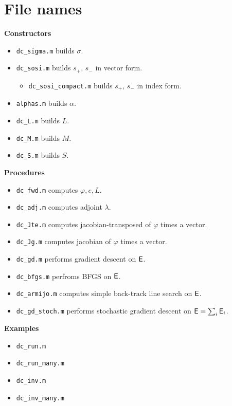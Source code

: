 \documentclass[a4paper,12pt]{article}
\begin{document}
\section{File names}
{\bf Constructors}
\begin{itemize}
\item \texttt{dc\_sigma.m} builds $\sigma$.
\item \texttt{dc\_sosi.m} builds $s_+,\, s_-$ in vector form.
\begin{itemize}
 \item \texttt{dc\_sosi\_compact.m} builds $s_+,\, s_-$ in index form.
\end{itemize}
\item \texttt{alphas.m} builds $\alpha$.
\item \texttt{dc\_L.m} builds $L$.
\item \texttt{dc\_M.m} builds $M$.
\item \texttt{dc\_S.m} builds $S$.
\end{itemize}
{\bf Procedures}
\begin{itemize}
\item \texttt{dc\_fwd.m} computes $\varphi,e,L$.
\item \texttt{dc\_adj.m} computes adjoint $\lambda$.
\item \texttt{dc\_Jte.m} computes jacobian-transposed of $\varphi$ times a vector.
\item \texttt{dc\_Jg.m} computes jacobian of $\varphi$ times a vector.
\item \texttt{dc\_gd.m} performs gradient descent on ${\sf E}$.
\item \texttt{dc\_bfgs.m} perfroms BFGS on ${\sf E}$.
\item \texttt{dc\_armijo.m} computes simple back-track line search on ${\sf E}$.
\item \texttt{dc\_gd\_stoch.m} performs stochastic gradient descent on ${\sf E} = \sum_i{\sf E}_i$.
\end{itemize}
{\bf Examples}
\begin{itemize}
 \item \texttt{dc\_run.m}
\item \texttt{dc\_run\_many.m}
\item \texttt{dc\_inv.m}
\item \texttt{dc\_inv\_many.m}
\end{itemize}
\newpage
\end{document}
